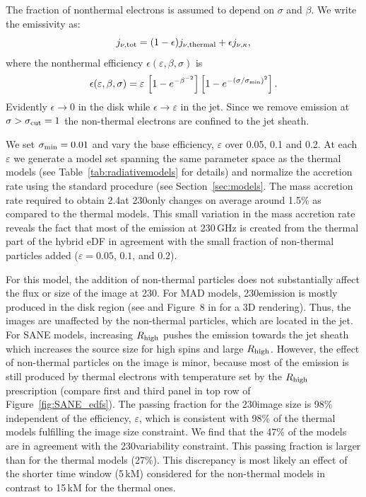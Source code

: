 The fraction of nonthermal electrons is assumed to depend on $\sigma$ and $\beta$.
We write the emissivity as:
\begin{equation}
  j_{\nu,\rm{tot}}=(1-\epsilon) j_{\nu,\rm{thermal}} + \epsilon j_{\nu, \kappa},
  \label{eq:kappaeff}
\end{equation}
where the nonthermal efficiency $\epsilon(\varepsilon, \beta, \sigma)$ is
\begin{equation}
  \epsilon(\varepsilon,\beta,\sigma)=\varepsilon\,
  \left[1 - e^{-\beta^{-2}}\right]
  \left[1-e^{-(\sigma/\sigma_{\rm min})^2}\right].
  \label{eq:efficiencybetasigma}
\end{equation}
Evidently $\epsilon \rightarrow 0$ in the disk while $\epsilon \rightarrow \varepsilon$ in the jet.
Since we remove emission at $\sigma > \sigma_{\rm cut} = 1$ the non-thermal electrons are confined to the jet sheath.

We set $\sigma_{\rm min}=0.01$ and vary the base efficiency, $\varepsilon$ over 0.05, 0.1 and 0.2.
At each $\varepsilon$ we generate a model set spanning the same parameter space as the thermal models (see Table~\ref{tab:radiativemodels} for details) and normalize the accretion rate using the standard procedure (see Section~\ref{sec:models}.
The mass accretion rate required to obtain 2.4\Jy at 230\GHz only changes on average around 1.5\% as compared to the thermal models.
This small variation in the mass accretion rate reveals the fact that most of the emission at 230\,GHz is created from the thermal part of the hybrid eDF in agreement with the small fraction of non-thermal particles added ($\varepsilon=0.05$, $0.1$, and $0.2$).

\label{varkappa230}

For this model, the addition of non-thermal particles does not substantially affect the flux or size of the image at 230\GHz.
For MAD models, 230\GHz emission is mostly produced in the disk region (see  and Figure~8 in \citealt{Wong_2022} for a 3D rendering).
Thus, the images are unaffected by the non-thermal particles, which are located in the jet.
For SANE models, increasing $R_\mathrm{high}$ pushes the emission towards the jet sheath which increases the source size for high spins and large $R_\mathrm{high}$.
However, the effect of non-thermal particles on the image is minor, because most of the emission is still produced by thermal electrons with temperature set by the $R_\mathrm{high}$ prescription (compare first and third panel in top row of Figure~\ref{fig:SANE_edfs}).
The passing fraction for the 230\GHz image size is 98\% independent of the efficiency, $\varepsilon$, which is consistent with 98\% of the thermal models fulfilling the image size constraint.
We find that the 47\% of the models are in agreement with the 230\GHz variability constraint.
This passing fraction is larger than for the thermal models (27\%).
This discrepancy is most likely an effect of the shorter time window (5\,kM) considered for the non-thermal models in contrast to 15\,kM for the thermal ones.

